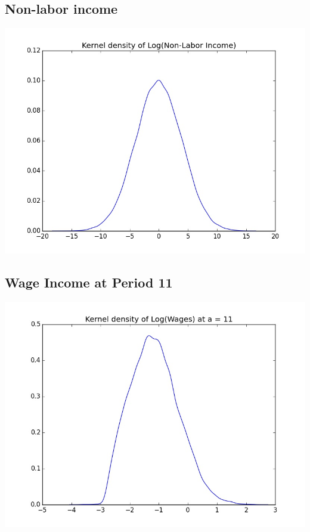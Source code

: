 \documentclass[11pt,letterpaper]{article}
\begin{document}
		{
		\centering
		\subsection{Non-labor income}
		\includegraphics[height=10cm,width=.9\textwidth]{Yden_normal_keep.jpg} \\
		\subsection{Wage Income at Period 11}
		\includegraphics[height=10cm,width=.9\textwidth]{logWages_normal_keep.jpg} \\
}
\end{document}

